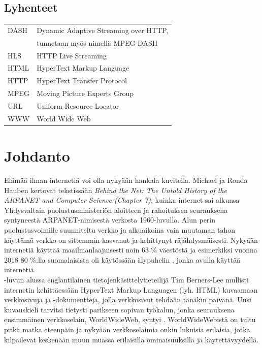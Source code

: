 \documentclass[finnish, 12pt, a4paper, elec, utf8, a-1b, online]{aaltothesis}
\begin{document}
\subsection*{Lyhenteet}
\begin{tabular}{ll}
  DASH      & Dynamic Adaptive Streaming over HTTP, \\
            & tunnetaan myös nimellä MPEG-DASH \\
  HLS       & HTTP Live Streaming \\
  HTML      & HyperText Markup Language \\
  HTTP      & HyperText Transfer Protocol \\
  MPEG      & Moving Picture Experts Group \\
  URL       & Uniform Resource Locator \\
  WWW       & World Wide Web \\
\end{tabular}

\cleardoublepage


\section{Johdanto}
  Elämää ilman internetiä voi olla nykyään hankala kuvitella. Michael ja Ronda Hauben kertovat tekstissään \textit{Behind the Net: The Untold History of the ARPANET and Computer Science (Chapter 7)}, kuinka internet sai alkunsa Yhdysvaltain puolustusministeriön aloitteen ja rahoituksen seurauksena syntyneestä ARPANET-nimisestä verkosta 1960-luvulla. \cite{Hauben} Alun perin puolustusvoimille suunniteltu verkko ja alkuaikoina vain muutaman tahon käyttämä verkko on sittemmin kasvanut ja kehittynyt räjähdysmäisesti. Nykyään internetiä käyttää maailmanlaajuisesti noin 63 \% väestöstä \cite{ITU} ja esimerkiksi vuonna 2018 80 \%:lla suomalaisista oli käytössään älypuhelin \cite{SVT}, jonka avulla käyttää internetiä. \\

  -luvun alussa englantilainen tietojenkäsittelytieteilijä Tim Berners-Lee mullisti internetin kehittäessään HyperText Markup Languagen (lyh. HTML) kuvaamaan verkkosivuja ja -dokumentteja, jolla verkkosivut tehdään tänäkin päivänä. Uusi kuvauskieli tarvitsi tietysti parikseen sopivan työkalun, jonka seurauksena ensimmäinen verkkoselain, WorldWideWeb, syntyi \cite{WorldWideWeb}. WorldWideWebistä on tultu pitkä matka eteenpäin ja nykyään verkkoselaimia onkin lukuisia erilaisia, jotka kilpailevat keskenään muun muassa erilaisilla ominaisuuksilla ja käytettävyydellä. \\
\end{document}
